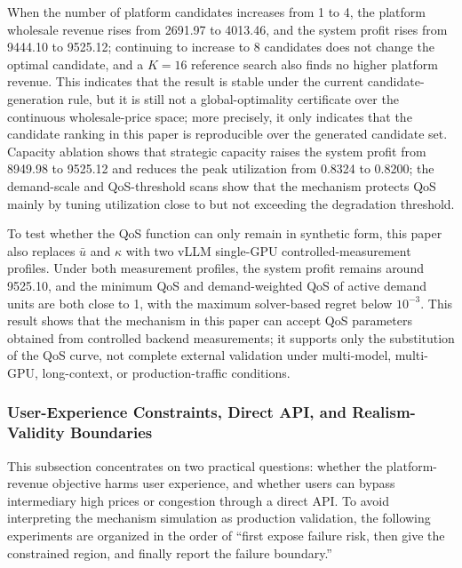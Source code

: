 \documentclass[11pt,a4paper]{article}
\begin{document}
When the number of platform candidates increases from 1 to 4, the platform wholesale revenue rises from 2691.97 to 4013.46, and the system profit rises from 9444.10 to 9525.12; continuing to increase to 8 candidates does not change the optimal candidate, and a $K=16$ reference search also finds no higher platform revenue. This indicates that the result is stable under the current candidate-generation rule, but it is still not a global-optimality certificate over the continuous wholesale-price space; more precisely, it only indicates that the candidate ranking in this paper is reproducible over the generated candidate set. Capacity ablation shows that strategic capacity raises the system profit from 8949.98 to 9525.12 and reduces the peak utilization from 0.8324 to 0.8200; the demand-scale and QoS-threshold scans show that the mechanism protects QoS mainly by tuning utilization close to but not exceeding the degradation threshold.

To test whether the QoS function can only remain in synthetic form, this paper also replaces $\bar u$ and $\kappa$ with two vLLM single-GPU controlled-measurement profiles. Under both measurement profiles, the system profit remains around 9525.10, and the minimum QoS and demand-weighted QoS of active demand units are both close to 1, with the maximum solver-based regret below $10^{-3}$. This result shows that the mechanism in this paper can accept QoS parameters obtained from controlled backend measurements; it supports only the substitution of the QoS curve, not complete external validation under multi-model, multi-GPU, long-context, or production-traffic conditions.

\subsubsection{User-Experience Constraints, Direct API, and Realism-Validity Boundaries}
\label{sec:realism_validation}

This subsection concentrates on two practical questions: whether the platform-revenue objective harms user experience, and whether users can bypass intermediary high prices or congestion through a direct API. To avoid interpreting the mechanism simulation as production validation, the following experiments are organized in the order of ``first expose failure risk, then give the constrained region, and finally report the failure boundary.''
\end{document}
